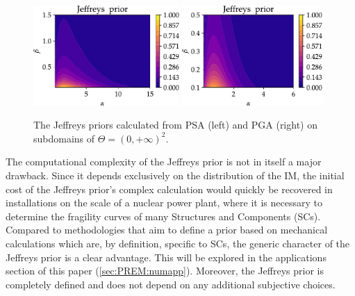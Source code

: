     \begin{figure}[h] %
        \centering
        \includegraphics[height=3.8cm]{figures/PREM/Jeff_prior_PSA-1.pdf}\hspace*{0.5cm}
        \includegraphics[height=3.8cm]{figures/PREM/Jeff_prior_PGA-2.pdf}
        \caption{The Jeffreys priors calculated from PSA (left) and PGA (right) on subdomains of $\Theta=(0,+\infty)^2$.}
        \label{fig:jeff_prior}
    \end{figure}
    







    The computational complexity of the Jeffreys prior is not in itself a major drawback. Since it depends exclusively on the distribution of the IM, the initial cost of the Jeffreys prior’s complex calculation would quickly be recovered in installations on the scale of a nuclear power plant, where it is necessary to determine the fragility curves of many Structures and Components (SCs). Compared to methodologies that aim to define a prior based on mechanical calculations which are, by definition, specific to SCs, the generic character of the Jeffreys prior is a clear advantage. This will be explored in the applications section of this paper (\cref{sec:PREM:numapp}). %
    Moreover, the Jeffreys prior is completely defined and does not depend on any additional subjective choices. 
    
